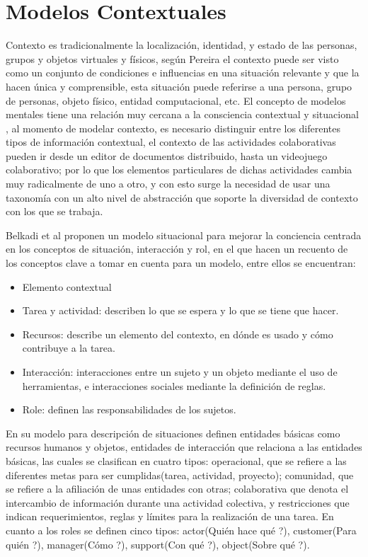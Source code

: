 \section{Modelos Contextuales}

Contexto es tradicionalmente la localizaci\'on, identidad, y estado de las personas, grupos y objetos virtuales y f\'isicos, seg\'un Pereira \cite{pereira2013CSCWD} el contexto puede ser visto como un conjunto de condiciones e influencias en una situaci\'on relevante y que la hacen \'unica y comprensible, esta situaci\'on puede referirse a una persona, grupo de personas, objeto f\'isico, entidad computacional, etc. El concepto de modelos mentales tiene una relaci\'on muy cercana a la consciencia contextual y situacional \cite{aehnelt2012discussion}, al momento de modelar contexto, es necesario distinguir entre los diferentes tipos de informaci\'on contextual\cite{hoyos2013domain}, el contexto de las actividades colaborativas pueden ir desde un editor de documentos distribuido, hasta un videojuego colaborativo; por lo que los elementos particulares de dichas actividades cambia muy radicalmente de uno a otro, y con esto surge la necesidad de usar una taxonom\'ia con un alto nivel de abstracci\'on que soporte la diversidad de contexto con los que se trabaja.

Belkadi et al \cite{Belkadi2013110} proponen un modelo situacional para mejorar la conciencia centrada en los conceptos de situaci\'on, interacci\'on y rol, en el que hacen un recuento de los conceptos clave a tomar en cuenta para un modelo, entre ellos se encuentran: 
\begin{itemize}
\item Elemento contextual
\item Tarea y actividad: describen lo que se espera y lo que se tiene que hacer.
\item Recursos: describe un elemento del contexto, en d\'onde es usado y c\'omo contribuye a la tarea.
\item Interacci\'on: interacciones entre un sujeto y un objeto mediante el uso de herramientas, e interacciones sociales mediante la definici\'on de reglas.
\item Role: definen las responsabilidades de los sujetos.
\end{itemize}

En su modelo para descripci\'on de situaciones definen entidades b\'asicas como recursos humanos y objetos, entidades de interacci\'on que relaciona a las entidades b\'asicas, las cuales se clasifican en cuatro tipos: operacional, que se refiere a las diferentes metas para ser cumplidas(tarea, actividad, proyecto); comunidad, que se refiere a la afiliaci\'on de unas entidades con otras; colaborativa que denota el intercambio de informaci\'on durante una actividad colectiva, y restricciones que indican requerimientos, reglas y l\'imites para la realizaci\'on de una tarea. En cuanto a los roles se definen cinco tipos: actor(\textquestiondown Qui\'en hace qu\'e ?), customer(\textquestiondown Para qui\'en ?), manager(\textquestiondown C\'omo ?), support(\textquestiondown Con qu\'e ?), object(\textquestiondown Sobre qu\'e ?).

